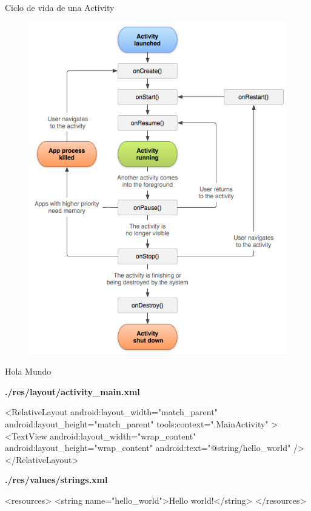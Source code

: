 \documentclass{beamer}
\begin{document}
\begin{frame}{Ciclo de vida de una Activity}
\begin{block}{}
\begin{figure}[H]
\centering
\includegraphics[scale=.33]{./img/activityLifecycle.png}
\end{figure}
\end{block}
\end{frame}

\begin{frame}[fragile]{Hola Mundo}
\begin{block}{}
\textbf{./res/layout/activity\_main.xml}
\begin{xmlcode}
<RelativeLayout
    android:layout_width="match_parent"
    android:layout_height="match_parent"
    tools:context=".MainActivity" >
    <TextView
        android:layout_width="wrap_content"
        android:layout_height="wrap_content"
        android:text="@string/hello_world" />
</RelativeLayout>
\end{xmlcode}
\textbf{./res/values/strings.xml}
\begin{xmlcode}
<resources>
    <string name="hello_world">Hello world!</string>
</resources>
\end{xmlcode}
\end{block}
\end{frame}
\end{document}

